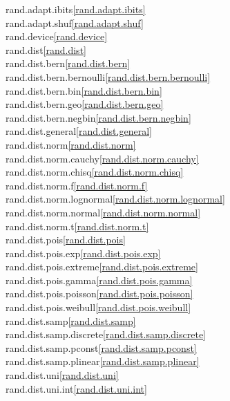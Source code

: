 \begin{multicols}{2}
rand.adapt.ibits\quad\ref{rand.adapt.ibits}\\
rand.adapt.shuf\quad\ref{rand.adapt.shuf}\\
rand.device\quad\ref{rand.device}\\
rand.dist\quad\ref{rand.dist}\\
rand.dist.bern\quad\ref{rand.dist.bern}\\
rand.dist.bern.bernoulli\quad\ref{rand.dist.bern.bernoulli}\\
rand.dist.bern.bin\quad\ref{rand.dist.bern.bin}\\
rand.dist.bern.geo\quad\ref{rand.dist.bern.geo}\\
rand.dist.bern.negbin\quad\ref{rand.dist.bern.negbin}\\
rand.dist.general\quad\ref{rand.dist.general}\\
rand.dist.norm\quad\ref{rand.dist.norm}\\
rand.dist.norm.cauchy\quad\ref{rand.dist.norm.cauchy}\\
rand.dist.norm.chisq\quad\ref{rand.dist.norm.chisq}\\
rand.dist.norm.f\quad\ref{rand.dist.norm.f}\\
rand.dist.norm.lognormal\quad\ref{rand.dist.norm.lognormal}\\
rand.dist.norm.normal\quad\ref{rand.dist.norm.normal}\\
rand.dist.norm.t\quad\ref{rand.dist.norm.t}\\
rand.dist.pois\quad\ref{rand.dist.pois}\\
rand.dist.pois.exp\quad\ref{rand.dist.pois.exp}\\
rand.dist.pois.extreme\quad\ref{rand.dist.pois.extreme}\\
rand.dist.pois.gamma\quad\ref{rand.dist.pois.gamma}\\
rand.dist.pois.poisson\quad\ref{rand.dist.pois.poisson}\\
rand.dist.pois.weibull\quad\ref{rand.dist.pois.weibull}\\
rand.dist.samp\quad\ref{rand.dist.samp}\\
rand.dist.samp.discrete\quad\ref{rand.dist.samp.discrete}\\
rand.dist.samp.pconst\quad\ref{rand.dist.samp.pconst}\\
rand.dist.samp.plinear\quad\ref{rand.dist.samp.plinear}\\
rand.dist.uni\quad\ref{rand.dist.uni}\\
rand.dist.uni.int\quad\ref{rand.dist.uni.int}\\

\end{multicols}
